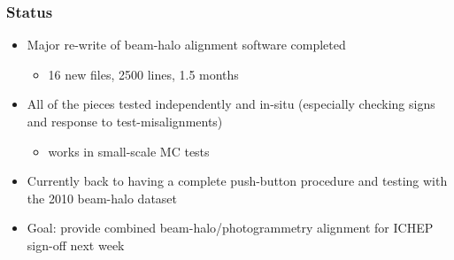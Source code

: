 \documentclass[compress]{beamer}
\begin{document}
\begin{frame}
\frametitle{Status}
\begin{itemize}\setlength{\itemsep}{0.25 cm}
\item Major re-write of beam-halo alignment software completed
\begin{itemize}
\item 16 new files, 2500 lines, 1.5 months
\end{itemize}
\item All of the pieces tested independently and in-situ (especially checking signs and response to test-misalignments)
\begin{itemize}
\item works in small-scale MC tests
\end{itemize}
\item Currently back to having a complete push-button procedure and
  testing with the 2010 beam-halo dataset
\end{itemize}

\vfill
\begin{itemize}\setlength{\itemsep}{0.25 cm}
\item Goal: provide combined beam-halo/photogrammetry alignment for ICHEP sign-off next week
\end{itemize}
\end{frame}
\end{document}
